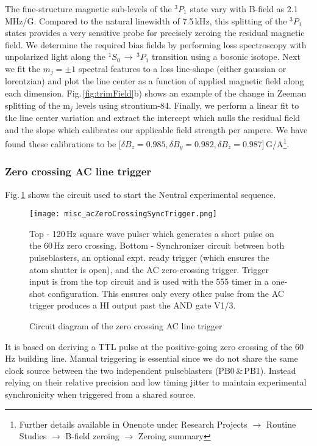 The fine-structure magnetic sub-levels of the $^3P_1$ state vary with B-field as 2.1\,MHz/G.
Compared to the natural linewidth of 7.5\,kHz, this splitting of the $^3P_1$ states provides a very sensitive probe for precisely zeroing the residual magnetic field.
We determine the required bias fields by performing loss spectroscopy with unpolarized light along the $^1S_0\,\rightarrow\,^3P_1$ transition using a bosonic isotope.
Next we fit the $m_j=\pm1$ spectral features to a loss line-shape (either gaussian or lorentzian) and plot the line center as a function of applied magnetic field along each dimension.
Fig.\,\ref{fig:trimField}b) shows an example of the change in Zeeman splitting of the m$_j$ levels using strontium-84.
Finally, we perform a linear fit to the line center variation and extract the intercept which nulls the residual field and the slope which calibrates our applicable field strength per ampere. 
We have found these calibrations to be [$\delta B_z = 0.985, \delta B_y = 0.982, \delta B_z = 0.987$]\,G/A\footnote{Further details available in Onenote under Research Projects $\rightarrow$ Routine Studies $\rightarrow$ B-field zeroing $\rightarrow$ Zeroing summary}.

\subsubsection{Zero crossing AC line trigger} \label{sec:expTrig}
Fig.\,\ref{fig:zeroCrossTrig} shows the circuit used to start the Neutral experimental sequence.
	\begin{figure}
		\centerline{
		\texttt{[image: misc\_acZeroCrossingSyncTrigger.png]}}
		\caption{Circuit diagram of the zero crossing AC line trigger}{Top - 120\,Hz square wave pulser which generates a short pulse on the 60\,Hz zero crossing. Bottom - Synchronizer circuit between both pulseblasters, an optional expt. ready trigger (which ensures the atom shutter is open), and the AC zero-crossing trigger. Trigger input is from the top circuit and is used with the 555 timer in a one-shot configuration. This ensures only every other pulse from the AC trigger produces a HI output past the AND gate V1/3.}
		\label{fig:zeroCrossTrig}
	\end{figure} 
It is based on deriving a TTL pulse at the positive-going zero crossing of the 60\,Hz building line.
Manual triggering is essential since we do not share the same clock source between the two independent pulseblasters (PB0\,\&\,PB1).
Instead relying on their relative precision and low timing jitter to maintain experimental synchronicity when triggered from a shared source.


